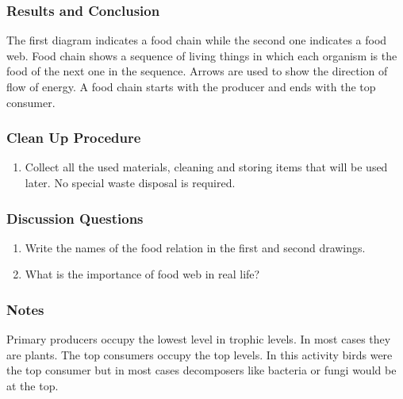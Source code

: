 \subsubsection*{Results and Conclusion}
The first diagram indicates a food chain while the second one indicates a food web. Food chain shows a sequence of living things in which each organism is the food of the next one in the sequence. Arrows are used to show the direction of flow of energy. A food chain starts with the producer and ends with the top consumer.

\subsubsection*{Clean Up Procedure}
\begin{enumerate}
\item{Collect all the used materials, cleaning and storing items that will be used later. No special waste disposal is required.}
\end{enumerate}

\subsubsection*{Discussion Questions}
\begin{enumerate}
\item{Write the names of the food relation in the first and second drawings.}
\item{What is the importance of food web in real life?}
\end{enumerate}

\subsubsection*{Notes}
Primary producers occupy the lowest level in trophic levels. In most cases they are plants. The top consumers occupy the top levels. In this activity birds were the top consumer but in most cases decomposers like bacteria or fungi would be at the top.
